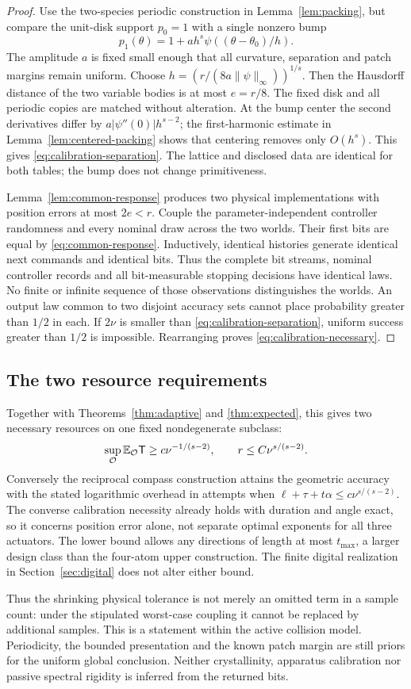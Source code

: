\begin{proof}
Use the two-species periodic construction in Lemma~\ref{lem:packing},
but compare the unit-disk support $p_0=1$ with a single nonzero bump
\[
 p_1(\theta)=1+a h^s\psi((\theta-\theta_0)/h).
\]
The amplitude $a$ is fixed small enough that all curvature, separation
and patch margins remain uniform. Choose
$h=(r/(8a\|\psi\|_\infty))^{1/s}$. Then the Hausdorff distance of
the two variable bodies is at most $e=r/8$. The fixed disk and all
periodic copies are matched without alteration. At the bump center
the second derivatives differ by $a|\psi''(0)|h^{s-2}$; the
first-harmonic estimate in Lemma~\ref{lem:centered-packing} shows that
centering removes only $O(h^s)$. This gives
\eqref{eq:calibration-separation}. The lattice and disclosed data are
identical for both tables; the bump does not change primitiveness.

Lemma~\ref{lem:common-response} produces two physical implementations
with position errors at most $2e<r$. Couple the parameter-independent
controller randomness and every nominal draw across the two worlds.
Their first bits are equal by \eqref{eq:common-response}. Inductively,
identical histories generate identical next commands and identical
bits. Thus the complete bit streams, nominal controller records and
all bit-measurable stopping decisions have identical laws. No finite
or infinite sequence of those observations distinguishes the worlds.
An output law common to two disjoint accuracy sets cannot place
probability greater than $1/2$ in each. If $2\nu$ is smaller than
\eqref{eq:calibration-separation}, uniform success greater than $1/2$
is impossible. Rearranging proves \eqref{eq:calibration-necessary}.
\end{proof}

\subsection{The two resource requirements}
Together with Theorems~\ref{thm:adaptive} and \ref{thm:expected}, this
gives two necessary resources on one fixed nondegenerate subclass:
\[
 \sup_{\mathcal O}\mathbb E_{\mathcal O}\mathsf T
       \ge c\nu^{-1/(s-2)},\qquad
 r\le C\nu^{s/(s-2)}.
\]
Conversely the reciprocal compass construction attains the geometric
accuracy with the stated logarithmic overhead in attempts when
$\ell+\tau+t\alpha\le c\nu^{s/(s-2)}$. The converse calibration
necessity already holds with duration and angle exact, so it concerns
position error alone, not separate optimal exponents for all three
actuators. The lower bound allows any directions of length at most
$t_{\max}$, a larger design class than the four-atom upper construction.
The finite digital realization in Section~\ref{sec:digital} does not
alter either bound.

Thus the shrinking physical tolerance is not merely an omitted term in
a sample count: under the stipulated worst-case coupling it cannot be
replaced by additional samples. This is a statement within the active
collision model. Periodicity, the bounded presentation and the known
patch margin are still priors for the uniform global conclusion.
Neither crystallinity, apparatus calibration nor passive spectral
rigidity is inferred from the returned bits.

